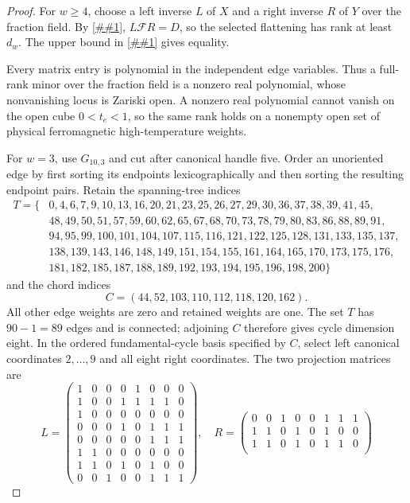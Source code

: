 \documentclass[11pt]{article}
\newcommand{\cref}[1]{\autoref{##1}}%
\newcommand{\cF}{\mathcal F}
\begin{document}
\begin{proof}
For \(w\geq4\), choose a left inverse \(L\) of \(X\) and a right inverse
\(R\) of \(Y\) over the fraction field.  By \cref{eq:XDY},
\(L\cF R=D\), so the selected flattening has rank at least \(d_w\).  The
upper bound in \cref{thm:grid-upper} gives equality.

Every matrix entry is polynomial in the independent edge variables.  Thus a
full-rank minor over the fraction field is a nonzero real polynomial, whose
nonvanishing locus is Zariski open.  A nonzero real polynomial cannot vanish
on the open cube \(0<t_e<1\), so the same rank holds on a nonempty open set
of physical ferromagnetic high-temperature weights.

For \(w=3\), use \(G_{10,3}\) and cut after canonical handle five.  Order an
unoriented edge by first sorting its endpoints lexicographically and then
sorting the resulting endpoint pairs.  Retain the spanning-tree indices
\[
\begin{split}
T=\{&0,4,6,7,9,10,13,16,20,21,23,25,26,27,29,30,36,37,38,39,41,45,\\
&48,49,50,51,57,59,60,62,65,67,68,70,73,78,79,80,83,86,88,89,91,\\
&94,95,99,100,101,104,107,115,116,121,122,125,128,131,133,135,137,\\
&138,139,143,146,148,149,151,154,155,161,164,165,170,173,175,176,\\
&181,182,185,187,188,189,192,193,194,195,196,198,200\}
\end{split}
\]
and the chord indices
\[
 C=(44,52,103,110,112,118,120,162).
\]
All other edge weights are zero and retained weights are one.  The set
\(T\) has \(90-1=89\) edges and is connected; adjoining \(C\) therefore
gives cycle dimension eight.  In the ordered fundamental-cycle basis
specified by \(C\), select left canonical coordinates \(2,\ldots,9\) and all
eight right coordinates.  The two projection matrices are
\[
L=\begin{pmatrix}
1&0&0&0&1&0&0&0\\1&0&0&1&1&1&1&0\\1&0&0&0&0&0&0&0\\
0&0&0&1&0&1&1&1\\0&0&0&0&0&1&1&1\\1&1&0&0&0&0&0&0\\
1&1&0&1&0&1&0&0\\0&0&1&0&0&1&1&1
\end{pmatrix},\quad
R=\begin{pmatrix}
0&0&1&0&0&1&1&1\\1&1&0&1&0&1&0&0\\1&1&0&1&0&1&1&0\\

\end{pmatrix}\]
\end{proof}
\end{document}
